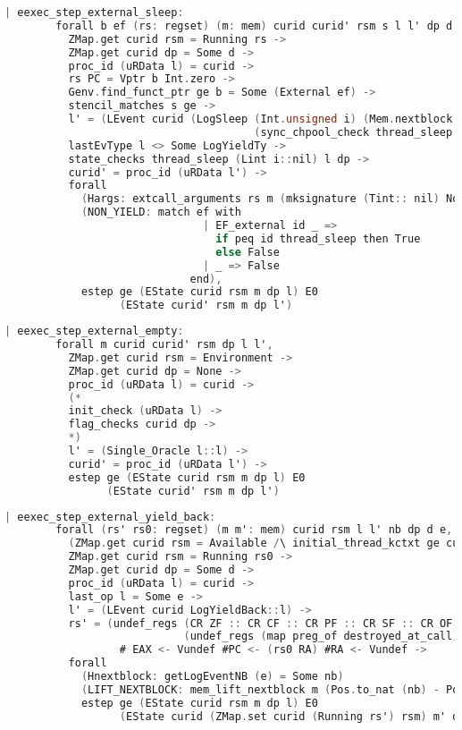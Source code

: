 \begin{lstlisting}[language=C]
    | eexec_step_external_sleep:
        forall b ef (rs: regset) (m: mem) curid curid' rsm s l l' dp d i,
          ZMap.get curid rsm = Running rs ->
          ZMap.get curid dp = Some d ->
          proc_id (uRData l) = curid ->
          rs PC = Vptr b Int.zero ->
          Genv.find_funct_ptr ge b = Some (External ef) ->
          stencil_matches s ge ->
          l' = (LEvent curid (LogSleep (Int.unsigned i) (Mem.nextblock m)
                                       (sync_chpool_check thread_sleep ((Lint i)::nil) (uRData l) d))::l) ->
          lastEvType l <> Some LogYieldTy ->
          state_checks thread_sleep (Lint i::nil) l dp ->
          curid' = proc_id (uRData l') ->
          forall
            (Hargs: extcall_arguments rs m (mksignature (Tint:: nil) None cc_default) (Vint i:: nil))
            (NON_YIELD: match ef with
                               | EF_external id _ => 
                                 if peq id thread_sleep then True
                                 else False
                               | _ => False
                             end),
            estep ge (EState curid rsm m dp l) E0
                  (EState curid' rsm m dp l')
\end{lstlisting}


\begin{lstlisting}[language=C]
    | eexec_step_external_empty:
        forall m curid curid' rsm dp l l',
          ZMap.get curid rsm = Environment ->
          ZMap.get curid dp = None ->
          proc_id (uRData l) = curid ->
          (*
          init_check (uRData l) ->
          flag_checks curid dp ->
          *)
          l' = (Single_Oracle l::l) ->
          curid' = proc_id (uRData l') ->
          estep ge (EState curid rsm m dp l) E0
                (EState curid' rsm m dp l')
\end{lstlisting}

\begin{lstlisting}[language=C]
    | eexec_step_external_yield_back:
        forall (rs' rs0: regset) (m m': mem) curid rsm l l' nb dp d e,
          (ZMap.get curid rsm = Available /\ initial_thread_kctxt ge curid l = Some rs0) \/
          ZMap.get curid rsm = Running rs0 ->
          ZMap.get curid dp = Some d ->
          proc_id (uRData l) = curid ->
          last_op l = Some e ->
          l' = (LEvent curid LogYieldBack::l) ->
          rs' = (undef_regs (CR ZF :: CR CF :: CR PF :: CR SF :: CR OF :: nil)
                            (undef_regs (map preg_of destroyed_at_call) rs0)) 
                  # EAX <- Vundef #PC <- (rs0 RA) #RA <- Vundef ->
          forall
            (Hnextblock: getLogEventNB (e) = Some nb)
            (LIFT_NEXTBLOCK: mem_lift_nextblock m (Pos.to_nat (nb) - Pos.to_nat (Mem.nextblock m) % nat) = m'),
            estep ge (EState curid rsm m dp l) E0
                  (EState curid (ZMap.set curid (Running rs') rsm) m' dp l').
\end{lstlisting}



